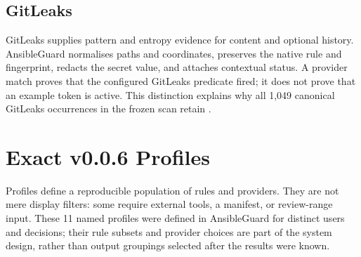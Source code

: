 \subsection{GitLeaks}
GitLeaks supplies pattern and entropy evidence for content and optional history.
AnsibleGuard normalises paths and coordinates, preserves the native rule and
fingerprint, redacts the secret value, and attaches contextual status. A
provider match proves that the configured GitLeaks predicate fired; it does not
prove that an example token is active. This distinction explains why all 1,049
canonical GitLeaks occurrences in the frozen scan retain
.

\section{Exact v0.0.6 Profiles}
Profiles define a reproducible population of rules and providers. They are not
mere display filters: some require external tools, a manifest, or review-range
input.
These 11 named profiles were defined in AnsibleGuard for distinct users and
decisions; their rule subsets and provider choices are part of the system
design, rather than output groupings selected after the results were known.

